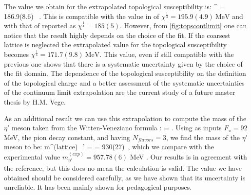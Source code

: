 
The value we obtain for the extrapolated topological susceptibility is:
\beq
    \chi^{} = 186.9(8.6)~ .
    \label{val:tops}
\eeq 
This is compatible with the value in \cite{shindler_nucleon_2015} of  $\chi^{\frac{1}{4}} = 195.9(4.9)~\text{MeV} $ and with that of \cite{ce_testing_2015} reported as $\chi^{\frac{1}{4}} = 185(5)$. However, from \cref{fig:topscontlimit} one can notice that the result highly depends on the choice of the fit. If the coarsest lattice is neglected the extrapolated value for the topological susceptibility becomes $\chi^{\frac{1}{4}}= 171.7(9.8)~\text{MeV}$. This value, even if still compatible with the previous one shows that there is a systematic uncertainty given by the choice of the fit domain. The  dependence of the topological susceptibility on the definition of the topological charge and a better assessment of the systematic uncertainties of the continuum limit extrapolation are the current study of a future master thesis by H.M. Vege. 

As an additional result we can use this extrapolation to compute the mass of the $\eta'$ meson taken from the Witten-Veneziano formula \cite{witten_current_1979}:
\beq
    \chi = .
\eeq 
Using as inputs $F_\pi = 92$ MeV, the pion decay constant, and having $N_{flavors} = 3$, we find the mass of the $\eta'$ meson to be:
\beq    
    m^{(lattice)}_{\eta'} =  = 930(27)~,
\eeq
which we compare with the experimental value  $m^{(exp)}_{\eta'} = 957.78(6)$ MeV \cite{dissertori_9._2016}. Our results is in agreement with the reference, but this does no mean the calculation is valid. The value we have obtained should be considered carefully, as we have shown that its uncertainty is unreliable. It has been mainly shown for pedagogical purposes.